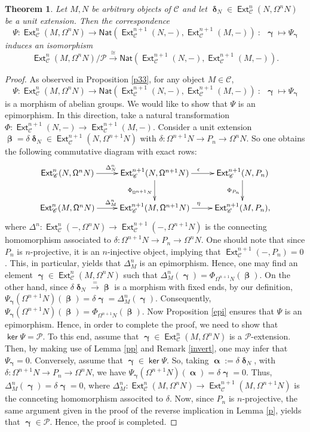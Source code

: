 \documentclass[11pt,a4paper]{amsart}
\newcommand{\rt}{\rightarrow}
\newcommand{\lrt}{\longrightarrow}
\newcommand{\st}{\stackrel}
\def\ker{\operatorname{\mathsf{ker}}}
\newcommand{\C}{\mathscr{C} }
\newcommand{\p}{\mathfrak{p} }
\def\Ext{\operatorname{{\mathsf{Ext}}}}
\def\syz{\mathsf{\Omega}}
\def\p{\mathcal P}
\def\al{\operatorname{\boldsymbol{\alpha}}}
\def\be{\operatorname{\boldsymbol{\beta}}}
\def\ga{\operatorname{\boldsymbol{\gamma}}}
\def\de{\operatorname{\boldsymbol{\delta}}}
\newcommand{\nat}{{\mathsf{Nat}}}
\newtheorem{theorem}{Theorem}[section]
\theoremstyle{definition}
\theoremstyle{plain}
\theoremstyle{definition}
\numberwithin{equation}{section}
\begin{document}
\begin{theorem}\label{nat} Let $M, N$ be arbitrary objects of $\C$ and let $\de_N\in\Ext^n_{\C}(N, \syz^nN)$ be a unit extension. Then the correspondence
$$\Psi: \Ext^n_{\C}(M, \syz^nN)\lrt{\nat}(\Ext^{n+1}_{\C}(N, -), \Ext^{n+1}_{\C}(M, -))~:~~\ga\mapsto \Psi_{\ga}$$
induces an isomorphism
$$\Ext^n_{\C}(M, \syz^nN)/{\p}\st{\cong}\lrt{\nat}(\Ext^{n+1}_{\C}(N, -), \Ext^{n+1}_{\C}(M, -)).$$
\end{theorem}
\begin{proof}
As observed in Proposition \ref{p33}, for any object $M\in\C$,  $$\Psi:\Ext^n_{\C}(M, \syz^nN)\lrt\nat(\Ext^{n+1}_{\C}(N,-), \Ext^{n+1}_{\C}(M, -))~:~~\ga\mapsto\Psi_{\ga}$$ is a morphism of abelian groups. We would like to show that $\Psi$ is an epimorphism. In this direction, take a natural transformation $\Phi:\Ext^{n+1}_{\C}(N,-)\lrt\Ext^{n+1}_{\C}(M, -)$. Consider a unit extension $\be=\delta\de_N\in\Ext^{n+1}_{\C}(N, \syz^{n+1}N)$ with $\delta:\syz^{n+1}N\rt P_n\rt\syz^nN$. So one obtains the following commutative diagram with exact rows:\[\xymatrix{\Ext^n_{\C}(N, \syz^nN)\ar[r]^{\Delta^n_N} & \Ext^{n+1}_{\C}(N, \syz^{n+1}N)\ar[r]^{\epsilon}\ar[d]_{\Phi_{\syz^{n+1}N}}& \Ext^{n+1}_{\C}(N, P_n)\ar[d]_{\Phi_{P_n}} \\ \Ext^n_{\C}(M, \syz^nN)\ar[r]^{\Delta^n_M}& \Ext^{n+1}_{\C}(M, \syz^{n+1}N)\ar[r]^{\eta}& \Ext^{n+1}_{\C}(M, P_n),}\]where $\Delta^n:\Ext^n_{\C}(-, \syz^nN)\lrt\Ext^{n+1}_{\C}(-, \syz^{n+1}N)$ is the connecting homomorphism associated to $\delta:\syz^{n+1}N\rt P_n\rt\syz^nN$. {One should note that since $P_n$ is $n$-projective,  it is an $n$-injective object, implying that $\Ext^{n+1}_{\C}(-, P_n)=0$. This, in particular, yields that $\Delta^n_M$ is an epimorphism.  Hence, }  one may find an element $\ga\in\Ext^n_{\C}(M, \syz^nN)$ such that $\Delta_M^n(\ga)=\Phi_{\syz^{n+1}N}(\be)$. On the other hand, since $\delta\de_N\st{=}\lrt\be$ is a morphism with fixed ends, by our definition, $\Psi_{\ga}(\syz^{n+1}N)(\be)=\delta\ga=\Delta_M^n(\ga)$. Consequently, $\Psi_{\ga}(\syz^{n+1}N)(\be)=\Phi_{\syz^{n+1}N}(\be).$ Now Proposition \ref{epi} ensures that $\Psi$ is an epimorphism. Hence, in order to complete the proof, we need to show that $\ker\Psi=\p$. To this end, assume that $\ga\in\Ext^n_{\C}(M, \syz^nN)$ is a $\p$-extension. Then, by making use of  Lemma \ref{pp} and Remark \ref{invert}, one may infer that $\Psi_{\ga}=0$. Conversely, assume that $\ga\in\ker\Psi$. So, taking $\al:=\delta\de_N$, with $\delta:\syz^{n+1}N\rt P_n\rt\syz^nN$, we have $\Psi_{\ga}(\syz^{n+1}N)(\al)=\delta\ga=0$. Thus, $\Delta^n_M(\ga)=\delta\ga=0$, where $\Delta_M^n:\Ext^n_{\C}(M, \syz^nN)\lrt\Ext^{n+1}_{\C}(M, \syz^{n+1}N)$ is the connceting homomorphism associted to $\delta$. Now, since $P_n$ is $n$-projective,  the same argument given in the proof of the reverse implication in Lemma \ref{p}, yields that $\ga\in\p$. Hence, the proof is completed.
\end{proof}
\end{document}
